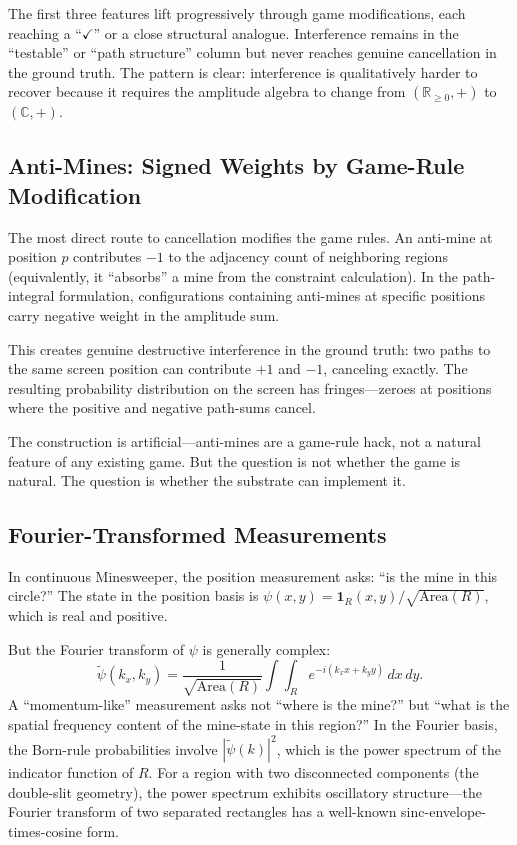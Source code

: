 \documentclass[12pt,a4paper]{article}
\theoremstyle{definition}
\theoremstyle{remark}
\newcommand{\R}{\mathbb{R}}
\newcommand{\C}{\mathbb{C}}
\newcommand{\Area}{\mathrm{Area}}
\begin{document}
The first three features lift progressively through game modifications, each reaching a ``$\checkmark$'' or a close structural analogue.  Interference remains in the ``testable'' or ``path structure'' column but never reaches genuine cancellation in the ground truth.  The pattern is clear: interference is qualitatively harder to recover because it requires the amplitude algebra to change from $(\R_{\geq 0}, +)$ to $(\C, +)$.

\subsection{Anti-Mines: Signed Weights by Game-Rule Modification}

The most direct route to cancellation modifies the game rules.  An anti-mine at position $p$ contributes $-1$ to the adjacency count of neighboring regions (equivalently, it ``absorbs'' a mine from the constraint calculation).  In the path-integral formulation, configurations containing anti-mines at specific positions carry negative weight in the amplitude sum.

This creates genuine destructive interference in the ground truth: two paths to the same screen position can contribute $+1$ and $-1$, canceling exactly.  The resulting probability distribution on the screen has fringes---zeroes at positions where the positive and negative path-sums cancel.

The construction is artificial---anti-mines are a game-rule hack, not a natural feature of any existing game.  But the question is not whether the game is natural.  The question is whether the substrate can implement it.

\subsection{Fourier-Transformed Measurements}
\label{sec:fourier}

In continuous Minesweeper, the position measurement asks: ``is the mine in this circle?''  The state in the position basis is $\psi(x,y) = \mathbf{1}_R(x,y) / \sqrt{\Area(R)}$, which is real and positive.

But the Fourier transform of $\psi$ is generally complex:
\begin{equation}\label{eq:fourier-state}
  \tilde{\psi}(k_x, k_y) = \frac{1}{\sqrt{\Area(R)}} \int\!\!\int_R e^{-i(k_x x + k_y y)} \, dx \, dy.
\end{equation}
A ``momentum-like'' measurement asks not ``where is the mine?'' but ``what is the spatial frequency content of the mine-state in this region?''  In the Fourier basis, the Born-rule probabilities involve $|\tilde{\psi}(k)|^2$, which is the power spectrum of the indicator function of $R$.  For a region with two disconnected components (the double-slit geometry), the power spectrum exhibits oscillatory structure---the Fourier transform of two separated rectangles has a well-known sinc-envelope-times-cosine form.
\end{document}
